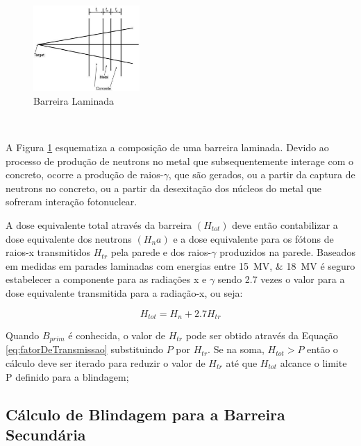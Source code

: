 \documentclass[11pt,a4paper]{article}
\begin{document}
            \begin{figure}
                \centering
                \includegraphics[width=0.36\textwidth]{Imagens/esquemaBarreiraLaminada.JPG}
                \caption{Barreira Laminada}
                \label{fig:esquemaBarreiraLaminada}
            \end{figure}
            
            \

            A Figura \ref{fig:esquemaBarreiraLaminada} esquematiza a composição de uma barreira laminada. Devido ao processo de produção de neutrons no metal que subsequentemente interage com o concreto, ocorre a produção de raios-$\gamma$, que são gerados, ou a partir da captura de neutrons no concreto, ou a partir da desexitação dos núcleos do metal que sofreram interação fotonuclear.

            A dose equivalente total através da barreira $(H_{tot})$ deve então contabilizar a dose equivalente dos neutrons $(H_na)$ e a dose equivalente para os fótons de raios-x transmitidos $ H_{tr}$ pela parede e dos raios-$\gamma$ produzidos na parede. Baseados em medidas em parades laminadas com energias entre \qtylist{15; 18}{MV} é seguro estabelecer a componente para as radiações x e $\gamma$ sendo 2.7 vezes o valor para a dose equivalente transmitida para a radiação-x, ou seja:

            \begin{equation}
                H_{tot} = H_n + 2.7 H_{tr}
            \end{equation}

            Quando $B_{prim}$ é conhecida, o valor de $H_{tr}$ pode ser obtido através da Equação \ref{eq:fatorDeTransmissao} substituindo $P$ por $H_{tr}$. Se na soma,  $H_{tot} > P$ então o cálculo deve ser iterado para reduzir o valor de $H_{tr}$ até que $H_{tot}$ alcance o limite P definido para a blindagem;

        \subsection{Cálculo de Blindagem para a Barreira Secundária}
\end{document}
